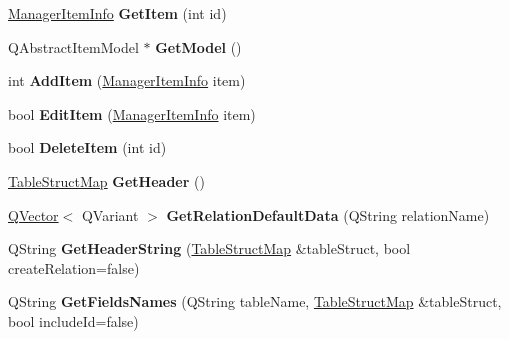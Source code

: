 \begin{DoxyCompactItemize}
\item 
\mbox{\label{class_table_handler_a8777b1d56a8c440112cd5a8508142819}} 
\hyperlink{class_i_extendable_data_base_manager_plugin_1_1_manager_data_item}{Manager\+Item\+Info} {\bfseries Get\+Item} (int id)
\item 
\mbox{\label{class_table_handler_ac2a1680219752ae5d66b69b3269aee82}} 
Q\+Abstract\+Item\+Model $\ast$ {\bfseries Get\+Model} ()
\item 
\mbox{\label{class_table_handler_a3723c124eddfb0931caa7c3300320226}} 
int {\bfseries Add\+Item} (\hyperlink{class_i_extendable_data_base_manager_plugin_1_1_manager_data_item}{Manager\+Item\+Info} item)
\item 
\mbox{\label{class_table_handler_aee4aa90513382109de7c1bc685de5e8a}} 
bool {\bfseries Edit\+Item} (\hyperlink{class_i_extendable_data_base_manager_plugin_1_1_manager_data_item}{Manager\+Item\+Info} item)
\item 
\mbox{\label{class_table_handler_af923ed419b08329aff43715a4cf8e5fa}} 
bool {\bfseries Delete\+Item} (int id)
\item 
\mbox{\label{class_table_handler_aa95f95bc82d4e627c6394bb41b4305a6}} 
\hyperlink{class_q_map}{Table\+Struct\+Map} {\bfseries Get\+Header} ()
\item 
\mbox{\label{class_table_handler_a69bf32558769e5d52cc2596b8883f258}} 
\hyperlink{class_q_vector}{Q\+Vector}$<$ Q\+Variant $>$ {\bfseries Get\+Relation\+Default\+Data} (Q\+String relation\+Name)
\item 
\mbox{\label{class_table_handler_a33f05e63998bdf3e1e99982bd9dc272c}} 
Q\+String {\bfseries Get\+Header\+String} (\hyperlink{class_q_map}{Table\+Struct\+Map} \&table\+Struct, bool create\+Relation=false)
\item 
\mbox{\label{class_table_handler_a9b8e9eb6a4c98d82237ab1e31effcc8a}} 
Q\+String {\bfseries Get\+Fields\+Names} (Q\+String table\+Name, \hyperlink{class_q_map}{Table\+Struct\+Map} \&table\+Struct, bool include\+Id=false)
\end{DoxyCompactItemize}
